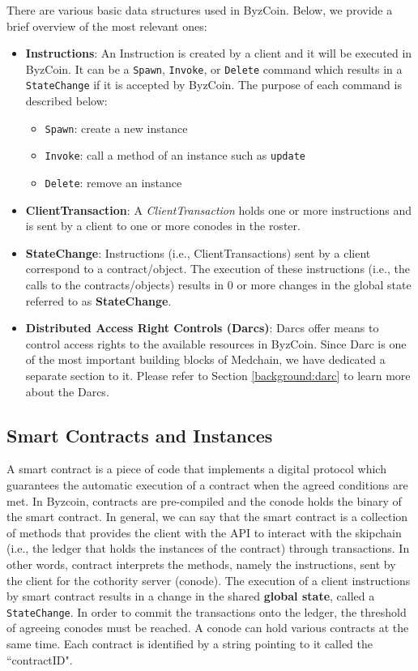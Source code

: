 There are various basic data structures used in ByzCoin. Below, we provide a brief overview of the most relevant ones:
\begin{itemize}
    \item{\textbf{Instructions}}: An Instruction is created by a client and it will be executed in ByzCoin. It can be a \texttt{Spawn}, \texttt{Invoke}, or \texttt{Delete} command which results in a \texttt{StateChange} if it is accepted by ByzCoin. The purpose of each command is described below:
    \begin{itemize}
        \item \texttt{Spawn}: create a new instance
        \item \texttt{Invoke}: call a method of an instance such as \texttt{update}
        \item \texttt{Delete}: remove an instance
    \end{itemize}
    
    \item{\textbf{ClientTransaction}}: A \textit{ClientTransaction} holds one or more instructions and is sent by a client to one or more conodes in the roster. 
    \item{\textbf{StateChange}}: Instructions (i.e., ClientTransactions) sent by a client correspond to a contract/object. The execution of these instructions (i.e., the calls to the contracts/objects) results in 0 or more changes in the global state referred to as \textbf{StateChange}. 
    \item{\textbf{Distributed Access Right Controls (Darcs)}}: Darcs offer means to control access rights to the available resources in ByzCoin. Since Darc is one of the most important building blocks of Medchain, we have dedicated a separate section to it. Please refer to Section \ref{background:darc} to learn more about the Darcs. 

\end{itemize}

\subsection{Smart Contracts and Instances} \label{background:smart_contract}
A smart contract is a piece of code that implements a digital protocol which guarantees the automatic execution of a contract when the agreed conditions are met. In Byzcoin, contracts are pre-compiled and the conode holds the binary of the smart contract. In general, we can say that the smart contract is a collection of methods that provides the client with the API to interact with the skipchain (i.e., the ledger that holds the instances of the contract) through transactions. In other words, contract interprets the methods, namely the instructions, sent by the client for the cothority server (conode). The execution of a client instructions by smart contract results in a change in the shared \textbf{global state}, called a \texttt{StateChange}. In order to commit the transactions onto the ledger, the threshold of agreeing conodes must be reached. A conode can hold various contracts at the same time. Each contract is identified by a string pointing to it called the ``contractID". 

